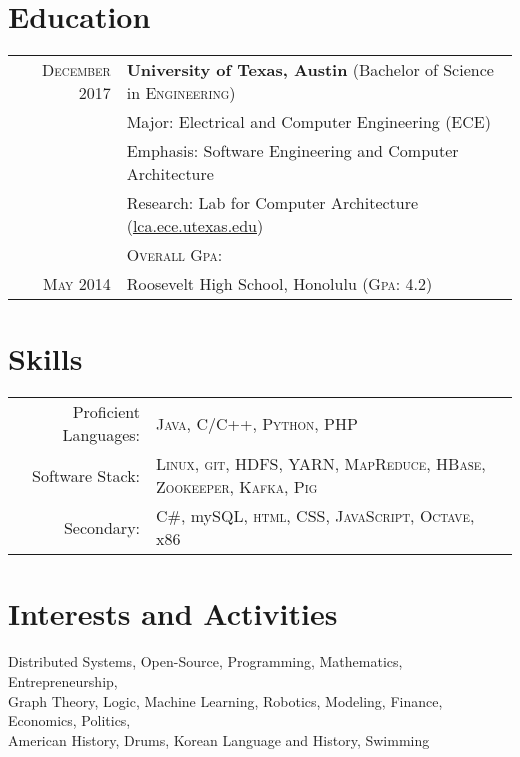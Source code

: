 \documentclass[a4paper,10pt]{article}
\begin{document}
\section{Education}
\begin{tabular}{rl}	

\textsc{December} 2017 
& \textbf{\color{medRed} University of Texas, Austin} (Bachelor of Science in \textsc{Engineering}) \\
& Major: Electrical and Computer Engineering (ECE) \\
& Emphasis: Software Engineering and Computer Architecture \\
& Research: Lab for Computer Architecture (\href{https://lca.ece.utexas.edu}{lca.ece.utexas.edu}) \\
&\normalsize \textsc{Overall Gpa}: \textbf{\color{red}{4.0}} \\[3mm]

\textsc{May} 2014 
& Roosevelt High School, Honolulu  (\textsc{Gpa}: 4.2)
\end{tabular}

\section{Skills}
\begin{tabular}{rl}
Proficient Languages:& \textsc{\color{medRed}Java}, \textsc{C/C++}, \textsc{Python}, \textsc{PHP} \\
Software Stack:& \textsc{Linux}, \textsc{git}, \textsc{HDFS}, \textsc{YARN}, \textsc{MapReduce}, \textsc{HBase}, \textsc{Zookeeper}, \textsc{Kafka}, \textsc{Pig} \\
Secondary:& \textsc{C\#}, my\textsc{SQL}, \textsc{html, CSS, JavaScript}, \textsc{Octave}, x86
\end{tabular}

\section{Interests and Activities}
\small Distributed Systems, Open-Source, Programming, Mathematics, Entrepreneurship, \\
Graph Theory, Logic, Machine Learning, Robotics, Modeling, Finance, Economics, Politics, \\
American History, Drums, Korean Language and History, Swimming 

\end{document}
